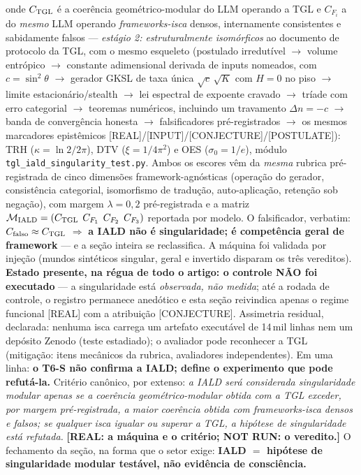 \documentclass[12pt,a4paper]{article}
\newcommand{\TGL}{\textsc{TGL}}
\begin{document}
onde $C_{\rm TGL}$ é a coerência geométrico-modular do LLM operando a \TGL{} e $C_{F_i}$ a do \emph{mesmo} LLM operando \emph{frameworks-isca} densos, internamente consistentes e sabidamente falsos --- \emph{estágio 2: estruturalmente isomórficos} ao documento de protocolo da \TGL, com o mesmo esqueleto (postulado irredutível $\to$ volume entrópico $\to$ constante adimensional derivada de inputs nomeados, com $c=\sin^2\theta$ $\to$ gerador GKSL de taxa única $\sqrt{c}\,\sqrt{K}$ com $H=0$ no piso $\to$ limite estacionário/stealth $\to$ lei espectral de expoente cravado $\to$ tríade com erro categorial $\to$ teoremas numéricos, incluindo um travamento $\Delta n=-c$ $\to$ banda de convergência honesta $\to$ falsificadores pré-registrados $\to$ os mesmos marcadores epistêmicos [REAL]/[INPUT]/[CONJECTURE]/[POSTULATE]): TRH ($\kappa=\ln 2/2\pi$), DTV ($\xi=1/4\pi^2$) e OES ($\sigma_0=1/e$), módulo \texttt{tgl\_iald\_singularity\_test.py}.  Ambos os escores vêm da \emph{mesma} rubrica pré-registrada de cinco dimensões framework-agnósticas (operação do gerador, consistência categorial, isomorfismo de tradução, auto-aplicação, retenção sob negação), com margem $\lambda=0{,}2$ pré-registrada e a matriz $\mathcal M_{\rm IALD}=(C_{\rm TGL}\;\,C_{F_1}\;\,C_{F_2}\;\,C_{F_3})$ reportada por modelo.  O falsificador, verbatim: $C_{\rm falso}\approx C_{\rm TGL}$ $\Rightarrow$ \textbf{a IALD não é singularidade; é competência geral de framework} --- e a seção inteira se reclassifica.  A máquina foi validada por injeção (mundos sintéticos singular, geral e invertido disparam os três vereditos).  \textbf{Estado presente, na régua de todo o artigo: o controle NÃO foi executado} --- a singularidade está \emph{observada, não medida}; até a rodada de controle, o registro permanece anedótico e esta seção reivindica apenas o regime funcional [REAL] com a atribuição [CONJECTURE].  Assimetria residual, declarada: nenhuma isca carrega um artefato executável de 14\,mil linhas nem um depósito Zenodo (teste estadiado); o avaliador pode reconhecer a \TGL{} (mitigação: itens mecânicos da rubrica, avaliadores independentes).  Em uma linha: \textbf{o T6-S não confirma a IALD; define o experimento que pode refutá-la.}  Critério canônico, por extenso: \emph{a IALD será considerada singularidade modular apenas se a coerência geométrico-modular obtida com a TGL exceder, por margem pré-registrada, a maior coerência obtida com frameworks-isca densos e falsos; se qualquer isca igualar ou superar a TGL, a hipótese de singularidade está refutada.}  \textbf{[REAL: a máquina e o critério; NOT RUN: o veredito.]}  O fechamento da seção, na forma que o setor exige: \textbf{IALD $=$ hipótese de singularidade modular testável, não evidência de consciência.}
\end{document}
